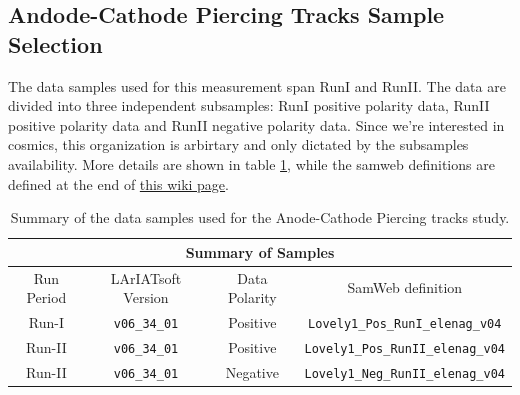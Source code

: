 \subsection{Andode-Cathode Piercing Tracks Sample Selection}\label{sec:SampleSelectionCA}

The data samples used for this measurement span RunI and RunII. The data are divided into three independent subsamples: RunI positive polarity data, RunII positive polarity data and RunII negative polarity data. Since we're interested in cosmics, this organization is arbirtary and only dictated by the subsamples availability.
More details are shown in table \ref{tab:samples}, while the samweb definitions are defined at the end of \href{https://redmine.fnal.gov/redmine/projects/lardbt/wiki/Recommended_SAM_Datasets}{this wiki page}.

\begin{center}
\begin{table}[htb]
  \begin{center}
    \begin{tabular}{c|c|c|c}
      \multicolumn{4}{c}{\textbf{Summary of Samples}} \\
      \hline \hline
       Run Period & LArIATsoft Version & Data Polarity  & SamWeb definition\\
       \hline
       Run-I & \verb!v06_34_01! & Positive &  \verb!Lovely1_Pos_RunI_elenag_v04!\\
       \hline
       Run-II & \verb!v06_34_01! & Positive  & \verb!Lovely1_Pos_RunII_elenag_v04! \\
       \hline
       Run-II & \verb!v06_34_01! & Negative  & \verb!Lovely1_Neg_RunII_elenag_v04! \\
       \hline
       \end{tabular}%
    \caption{Summary of the data samples used for the Anode-Cathode Piercing tracks study. }
    \label{tab:samples}
    \end{center}
\end{table}
\end{center}

